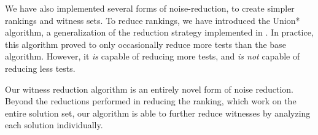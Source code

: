 \documentclass[11pt,twoside]{article}
\theoremstyle{definition}
\let\cite=\citep
\begin{document}
We have also implemented several forms of noise-reduction, to create simpler rankings and witness sets. To reduce rankings, we have introduced the Union* algorithm, a generalization of the reduction strategy implemented in \cite{Claessen}. In practice, this algorithm proved to only occasionally reduce more tests than the base algorithm. However, it \emph{is} capable of reducing more tests, and \emph{is not} capable of reducing less tests.

Our witness reduction algorithm is an entirely novel form of noise reduction. Beyond the reductions performed in reducing the ranking, which work on the entire solution set, our algorithm is able to further reduce witnesses by analyzing each solution individually.



\end{document}
